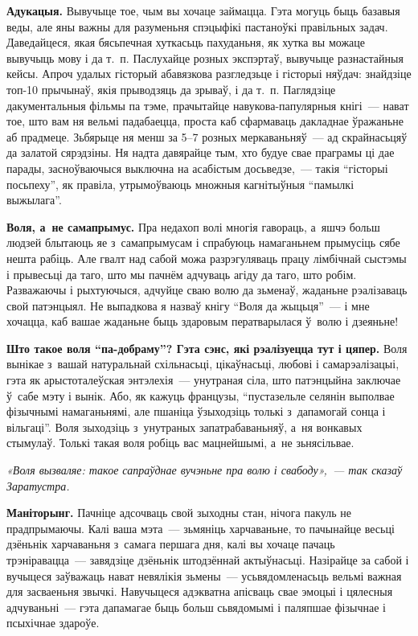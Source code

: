 \textbf{Адукацыя.} Вывучыце тое, чым вы хочаце займацца. Гэта могуць быць базавыя веды, але яны важны для разуменьня спэцыфікі пастаноўкі правільных задач. Даведайцеся, якая бясьпечная хуткасьць пахуданьня, як хутка вы можаце вывучыць мову і да т.~п. Паслухайце розных экспэртаў, вывучыце разнастайныя кейсы. Апроч удалых гісторый абавязкова разгледзьце і гісторыі няўдач: знайдзіце топ-10 прычынаў, якія прыводзяць да зрываў, і да т.~п. Паглядзіце дакументальныя фільмы па тэме, прачытайце навукова-папулярныя кнігі~--- нават тое, што вам ня вельмі падабаецца, проста каб сфармаваць дакладнае ўражаньне аб прадмеце. Зьбярыце ня менш за 5--7 розных меркаваньняў~--- ад скрайнасьцяў да залатой сярэдзіны. Ня надта давярайце тым, хто будуе свае праграмы ці дае парады, засноўваючыся выключна на асабістым досьведзе,~--- такія ``гісторыі посьпеху'', як правіла, утрымоўваюць множныя кагнітыўныя ``памылкі выжылага''.

\textbf{Воля, а~не самапрымус.} Пра недахоп волі многія гавораць, а~яшчэ больш людзей блытаюць яе з~самапрымусам і спрабуюць намаганьнем прымусіць сябе нешта рабіць. Але гвалт над сабой можа разрэгуляваць працу лімбічнай сыстэмы і прывесьці да таго, што мы пачнём адчуваць агіду да таго, што робім. Разважаючы і рыхтуючыся, адчуйце сваю волю да зьменаў, жаданьне рэалізаваць свой патэнцыял. Не выпадкова я назваў кнігу ``Воля да жыцьця''~--- і мне хочацца, каб вашае жаданьне быць здаровым ператварылася ў~волю і дзеяньне!

\textbf{Што такое воля ``па-добраму''? Гэта сэнс, які рэалізуецца тут і цяпер.} Воля вынікае з~вашай натуральнай схільнасьці, цікаўнасьці, любові і самарэалізацыі, гэта як арыстоталеўская энтэлехія~--- унутраная сіла, што патэнцыйна заключае ў~сабе мэту і вынік. Або, як кажуць французы, ``пустазельле селянін выполвае фізычнымі намаганьнямі, але пшаніца ўзыходзіць толькі з~дапамогай сонца і вільгаці''. Воля зыходзіць з~унутраных запатрабаваньняў, а~ня вонкавых стымулаў. Толькі такая воля робіць вас мацнейшымі, а~не зьнясільвае.

\emph{«Воля вызваляе: такое сапраўднае вучэньне пра волю і свабоду»,~--- так сказаў Заратустра.}

\textbf{Маніторынг.} Пачніце адсочваць свой зыходны стан, нічога пакуль не прадпрымаючы. Калі ваша мэта~--- зьмяніць харчаваньне, то пачынайце весьці дзёньнік харчаваньня з~самага першага дня, калі вы хочаце пачаць трэніравацца~--- завядзіце дзёньнік штодзённай актыўнасьці. Назірайце за сабой і вучыцеся заўважаць нават невялікія зьмены~--- усьвядомленасьць вельмі важная для засваеньня звычкі. Навучыцеся адэкватна апісваць свае эмоцыі і цялесныя адчуваньні~--- гэта дапамагае быць больш сьвядомымі і паляпшае фізычнае і псыхічнае здароўе.


